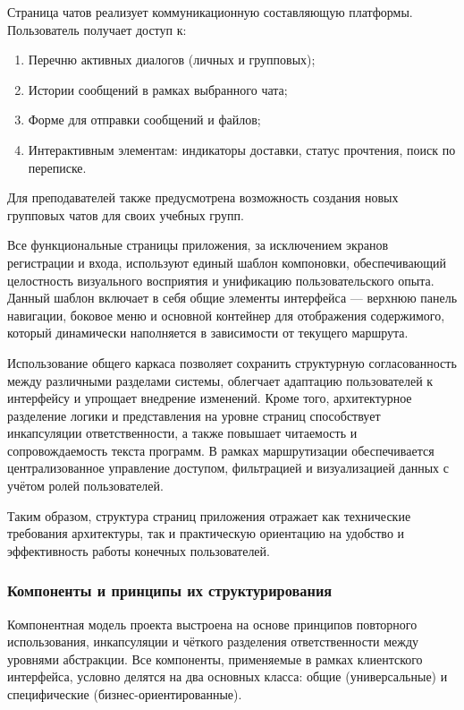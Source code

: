 Страница чатов реализует коммуникационную составляющую платформы. Пользователь получает доступ к:
\begin{enumerate}
\item Перечню активных диалогов (личных и групповых);
\item Истории сообщений в рамках выбранного чата;
\item Форме для отправки сообщений и файлов;
\item Интерактивным элементам: индикаторы доставки, статус прочтения, поиск по переписке.
\end{enumerate}
Для преподавателей также предусмотрена возможность создания новых групповых чатов для своих учебных групп.

Все функциональные страницы приложения, за исключением экранов регистрации и входа, используют единый шаблон компоновки, обеспечивающий целостность визуального восприятия и унификацию пользовательского опыта. Данный шаблон включает в себя общие элементы интерфейса — верхнюю панель навигации, боковое меню и основной контейнер для отображения содержимого, который динамически наполняется в зависимости от текущего маршрута.

Использование общего каркаса позволяет сохранить структурную согласованность между различными разделами системы, облегчает адаптацию пользователей к интерфейсу и упрощает внедрение изменений. Кроме того, архитектурное разделение логики и представления на уровне страниц способствует инкапсуляции ответственности, а также повышает читаемость и сопровождаемость текста программ. В рамках маршрутизации обеспечивается централизованное управление доступом, фильтрацией и визуализацией данных с учётом ролей пользователей.

Таким образом, структура страниц приложения отражает как технические требования архитектуры, так и практическую ориентацию на удобство и эффективность работы конечных пользователей.

\subsubsection{Компоненты и принципы их структурирования}

Компонентная модель проекта выстроена на основе принципов повторного использования, инкапсуляции и чёткого разделения ответственности между уровнями абстракции. Все компоненты, применяемые в рамках клиентского интерфейса, условно делятся на два основных класса: общие (универсальные) и специфические (бизнес-ориентированные).


